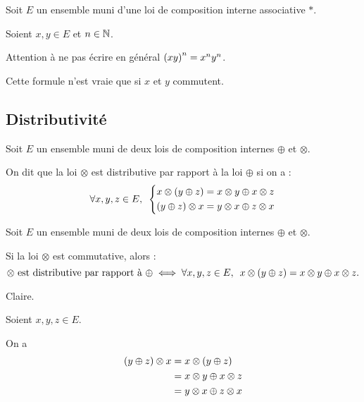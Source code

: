 \begin{rem}
Soit \(E\) un ensemble muni d'une loi de composition interne associative \(*\).

Soient \(x,y\in E\) et \(n\in\mathbb{N}\).

Attention à ne pas écrire en général \(\left(xy\right)^n=x^ny^n\).

Cette formule n'est vraie que si \(x\) et \(y\) commutent.
\end{rem}

\subsection{Distributivité}

\begin{defi}[Distributivité]
Soit \(E\) un ensemble muni de deux lois de composition internes \(\oplus\) et \(\otimes\).

On dit que la loi \(\otimes\) est distributive par rapport à la loi \(\oplus\) si on a : \[\quantifs{\forall x,y,z\in E}\begin{dcases}x\otimes\paren{y\oplus z}=x\otimes y\oplus x\otimes z \\ \paren{y\oplus z}\otimes x=y\otimes x\oplus z\otimes x\end{dcases}\]
\end{defi}

\begin{rem}
Soit \(E\) un ensemble muni de deux lois de composition internes \(\oplus\) et \(\otimes\).

Si la loi \(\otimes\) est commutative, alors : \[\otimes\text{ est distributive par rapport à }\oplus\ssi\quantifs{\forall x,y,z\in E}x\otimes\paren{y\oplus z}=x\otimes y\oplus x\otimes z.\]
\end{rem}

\begin{dem}
\impdir Claire.

\imprec

Soient \(x,y,z\in E\).

On a \[\begin{aligned}
\left(y\oplus z\right)\otimes x&=x\otimes\left(y\oplus z\right) \\
&=x\otimes y\oplus x\otimes z \\
&=y\otimes x\oplus z\otimes x
\end{aligned}\]
\end{dem}


